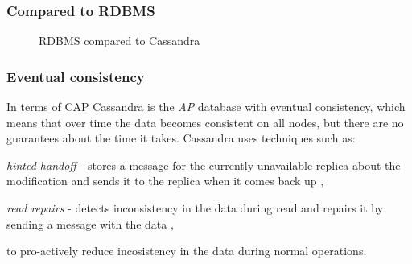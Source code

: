\subsubsection{Compared to RDBMS}
\begin{figure}[hbt]
  \setlength{\unitlength}{1.3cm}  
  \caption{RDBMS compared to Cassandra}
  \label{fig:cassandraToRdbms}
\end{figure}

\subsubsection{Eventual consistency}\label{sec:theory:eventualConsistency}
In terms of CAP \cite{brewer2000towards} \cite{Brewer:2012ba} Cassandra is the \emph{AP} database with eventual consistency, which means that over time the data becomes consistent on all nodes, but there are no guarantees about the time it takes. Cassandra uses techniques such as: \begin{enumerate*} 
\item \emph{hinted handoff} - stores a message for the currently unavailable replica about the modification and sends it to the replica when it comes back up \cite{CassandraHintedHandoff},  
\item \emph{read repairs} - detects inconsistency in the data during read and repairs it by sending a message with the data \cite{CassandraReadRepair},  \end{enumerate*} to pro-actively reduce incosistency in the data during normal operations.

